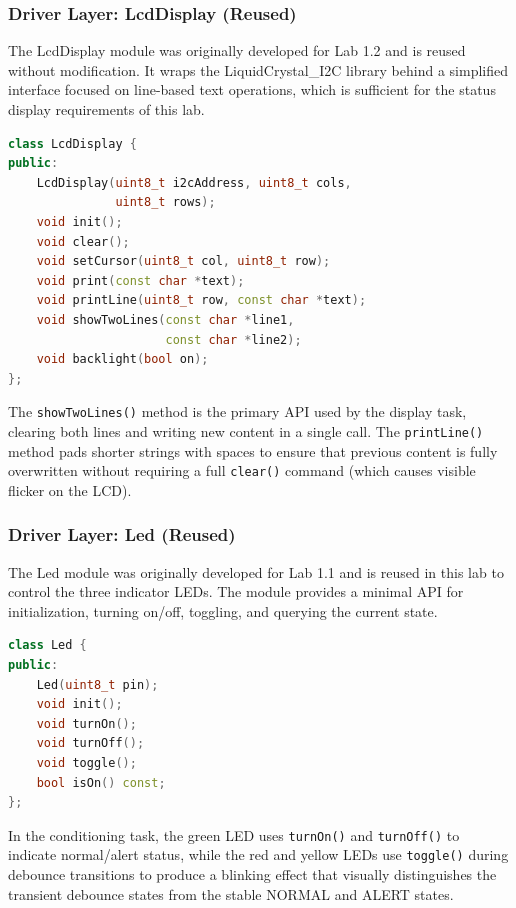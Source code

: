 \subsubsection{Driver Layer: LcdDisplay (Reused)}

The LcdDisplay module was originally developed for Lab 1.2 and is reused without modification. It wraps the LiquidCrystal\_I2C library behind a simplified interface focused on line-based text operations, which is sufficient for the status display requirements of this lab.

\begin{lstlisting}[language=C++, caption=LcdDisplay interface (LcdDisplay.h) --- reused from Lab 1.2, label=lst:lcd_display_h]
class LcdDisplay {
public:
    LcdDisplay(uint8_t i2cAddress, uint8_t cols,
               uint8_t rows);
    void init();
    void clear();
    void setCursor(uint8_t col, uint8_t row);
    void print(const char *text);
    void printLine(uint8_t row, const char *text);
    void showTwoLines(const char *line1,
                      const char *line2);
    void backlight(bool on);
};
\end{lstlisting}

The \texttt{showTwoLines()} method is the primary API used by the display task, clearing both lines and writing new content in a single call. The \texttt{printLine()} method pads shorter strings with spaces to ensure that previous content is fully overwritten without requiring a full \texttt{clear()} command (which causes visible flicker on the LCD).

\subsubsection{Driver Layer: Led (Reused)}

The Led module was originally developed for Lab 1.1 and is reused in this lab to control the three indicator LEDs. The module provides a minimal API for initialization, turning on/off, toggling, and querying the current state.

\begin{lstlisting}[language=C++, caption=Led interface (Led.h) --- reused from Lab 1.1, label=lst:led_h]
class Led {
public:
    Led(uint8_t pin);
    void init();
    void turnOn();
    void turnOff();
    void toggle();
    bool isOn() const;
};
\end{lstlisting}

In the conditioning task, the green LED uses \texttt{turnOn()} and \texttt{turnOff()} to indicate normal/alert status, while the red and yellow LEDs use \texttt{toggle()} during debounce transitions to produce a blinking effect that visually distinguishes the transient debounce states from the stable NORMAL and ALERT states.

